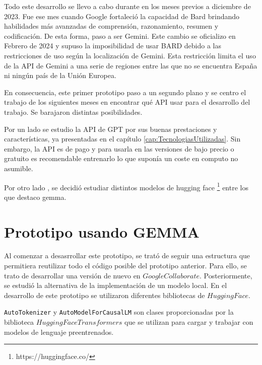 Todo este desarrollo se llevo a cabo durante en los meses previos a diciembre de 2023. Fue ese mes cuando Google fortaleció la capacidad de Bard brindando habilidades más avanzadas de comprensión, razonamiento, resumen y codificación. De esta forma, paso a ser Gemini. Este cambio se oficializo en Febrero de 2024 y supuso la imposibilidad de usar BARD debido a las restricciones de uso según la localización de Gemini. Esta restricción limita el uso de la API de Gemini a una serie de regiones entre las que no se encuentra España ni ningún país de la Unión Europea.

En consecuencia, este primer prototipo paso a un segundo plano y se centro el trabajo de los siguientes meses en encontrar qué API usar para el desarrollo del trabajo. Se barajaron distintas posibilidades. 

Por un lado se estudio la API de GPT por sus buenas prestaciones y características, ya presentadas en el capítulo \ref{cap:TecnologiasUtilizadas}. Sin embargo, la API es de pago y para usarla en las versiones de bajo precio o gratuito es recomendable entrenarlo lo que suponía un coste en computo no asumible. 

Por otro lado , se decidió estudiar distintos modelos de hugging face \footnote{https://huggingface.co/} entre los que destaco gemma. 

\section{Prototipo usando GEMMA}
Al comenzar a desasrrollar este prototipo, se trató de seguir una estructura que permitiera reutilizar todo el código posible del prototipo anterior. Para ello, se trato de desarrollar una versión de nuevo en $Google Collaborate$. Posteriormente, se estudió la alternativa de la implementación de un modelo local. En el desarrollo de este prototipo se utilizaron diferentes bibliotecas de $Hugging Face$.

\texttt{AutoTokenizer} y \texttt{AutoModelForCausalLM} son clases proporcionadas por la biblioteca $Hugging Face Transformers$ que se utilizan para cargar y trabajar con modelos de lenguaje preentrenados.

